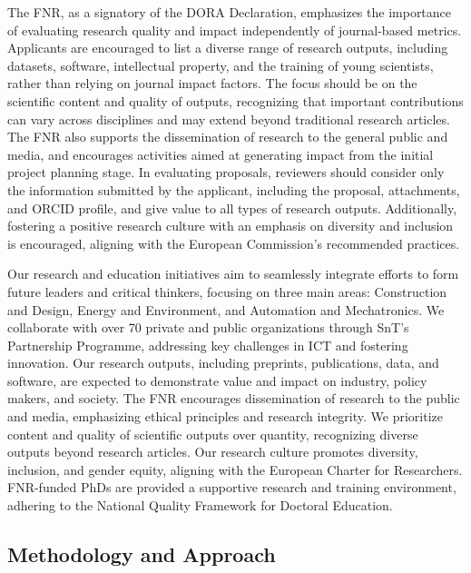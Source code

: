 \documentclass[12pt]{article}
\begin{document}
The FNR, as a signatory of the DORA Declaration, emphasizes the importance of evaluating research quality and impact independently of journal-based metrics. Applicants are encouraged to list a diverse range of research outputs, including datasets, software, intellectual property, and the training of young scientists, rather than relying on journal impact factors. The focus should be on the scientific content and quality of outputs, recognizing that important contributions can vary across disciplines and may extend beyond traditional research articles. The FNR also supports the dissemination of research to the general public and media, and encourages activities aimed at generating impact from the initial project planning stage. In evaluating proposals, reviewers should consider only the information submitted by the applicant, including the proposal, attachments, and ORCID profile, and give value to all types of research outputs. Additionally, fostering a positive research culture with an emphasis on diversity and inclusion is encouraged, aligning with the European Commission’s recommended practices.

Our research and education initiatives aim to seamlessly integrate efforts to form future leaders and critical thinkers, focusing on three main areas: Construction and Design, Energy and Environment, and Automation and Mechatronics. We collaborate with over 70 private and public organizations through SnT’s Partnership Programme, addressing key challenges in ICT and fostering innovation. Our research outputs, including preprints, publications, data, and software, are expected to demonstrate value and impact on industry, policy makers, and society. The FNR encourages dissemination of research to the public and media, emphasizing ethical principles and research integrity. We prioritize content and quality of scientific outputs over quantity, recognizing diverse outputs beyond research articles. Our research culture promotes diversity, inclusion, and gender equity, aligning with the European Charter for Researchers. FNR-funded PhDs are provided a supportive research and training environment, adhering to the National Quality Framework for Doctoral Education.

\subsection{Methodology and Approach}
\end{document}
